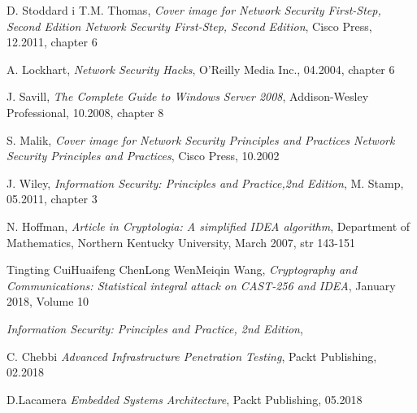 \documentclass[12p]{article}
\begin{document}
\newpage
\begin{thebibliography}{99}

 D. Stoddard i T.M. Thomas,
\emph{
Cover image for Network Security First-Step, Second Edition
Network Security First-Step, Second Edition},
Cisco Press, 12.2011, chapter 6

 A. Lockhart,
\emph{Network Security Hacks},
O'Reilly Media Inc., 04.2004, chapter 6

 J. Savill,
\emph{The Complete Guide to Windows Server 2008},
Addison-Wesley Professional, 10.2008, chapter 8

 S. Malik,
\emph{Cover image for Network Security Principles and Practices
Network Security Principles and Practices},
Cisco Press, 10.2002

 J. Wiley,
\emph{Information Security: Principles and Practice,2nd Edition},
M. Stamp, 05.2011, chapter 3

 N. Hoffman,
\emph{Article in Cryptologia: A simplified IDEA algorithm},
Department of Mathematics, Northern Kentucky University, March 2007, str 143-151

 Tingting CuiHuaifeng ChenLong WenMeiqin Wang,
\emph{Cryptography and Communications: Statistical integral attack on CAST-256 and IDEA}, January 2018, Volume 10

\emph{Information Security: Principles and Practice, 2nd Edition},

 C. Chebbi
\emph{Advanced Infrastructure Penetration Testing},
Packt Publishing, 02.2018

D.Lacamera
\emph{Embedded Systems Architecture},
Packt Publishing, 05.2018


\end{thebibliography}
\newpage
\listoffigures
{}
\end{document}
